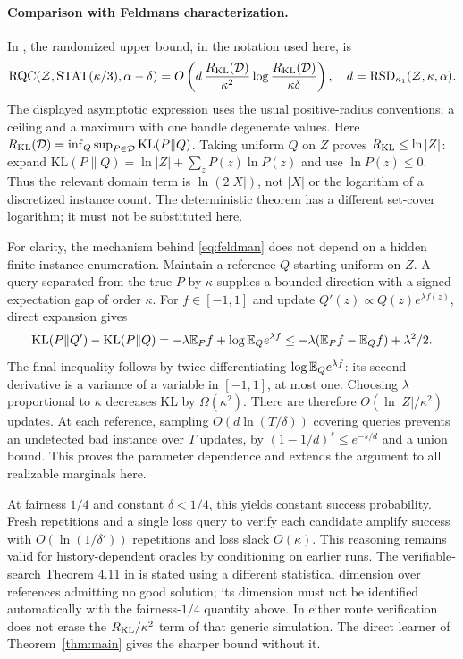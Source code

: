 \paragraph{Comparison with Feldman\textquotesingle s characterization.}
In \citet[Theorem 4.8]{Feldman17}, the randomized upper bound, in the notation used here, is
\begin{equation}\label{eq:feldman}
 \operatorname{RQC}(\mathcal Z,\operatorname{STAT}(\kappa/3),\alpha-\delta)
 =O\left(d\,\frac{R_{\rm KL}(\mathcal D)}{\kappa^2}
       \log\frac{R_{\rm KL}(\mathcal D)}{\kappa\delta}\right),
 \quad d=\operatorname{RSD}_{\kappa_1}(\mathcal Z,\kappa,\alpha).
\end{equation}
The displayed asymptotic expression uses the usual positive-radius conventions; a ceiling and a maximum with one handle degenerate values. Here $R_{\rm KL}(\mathcal D)=\inf_Q\sup_{P\in\mathcal D}\mathrm{KL}(P\|Q)$. Taking uniform $Q$ on $Z$ proves $R_{\rm KL}\le\ln|Z|$: expand $\mathrm{KL}(P\|Q)=\ln|Z|+\sum_zP(z)\ln P(z)$ and use $\ln P(z)\le0$. Thus the relevant domain term is $\ln(2|X|)$, not $|X|$ or the logarithm of a discretized instance count. The deterministic theorem has a different set-cover logarithm; it must not be substituted here.

For clarity, the mechanism behind \eqref{eq:feldman} does not depend on a hidden finite-instance enumeration. Maintain a reference $Q$ starting uniform on $Z$. A query separated from the true $P$ by $\kappa$ supplies a bounded direction with a signed expectation gap of order $\kappa$. For $f\in[-1,1]$ and update $Q'(z)\propto Q(z)e^{\lambda f(z)}$, direct expansion gives
\[
 \mathrm{KL}(P\|Q')-\mathrm{KL}(P\|Q)
 =-\lambda\mathbb E_Pf+\log\mathbb E_Qe^{\lambda f}
 \le-\lambda(\mathbb E_Pf-\mathbb E_Qf)+\lambda^2/2.
\]
The final inequality follows by twice differentiating $\log\mathbb E_Qe^{\lambda f}$: its second derivative is a variance of a variable in $[-1,1]$, at most one. Choosing $\lambda$ proportional to $\kappa$ decreases KL by $\Omega(\kappa^2)$. There are therefore $O(\ln|Z|/\kappa^2)$ updates. At each reference, sampling $O(d\ln(T/\delta))$ covering queries prevents an undetected bad instance over $T$ updates, by $(1-1/d)^s\le e^{-s/d}$ and a union bound. This proves the parameter dependence and extends the argument to all realizable marginals here.

At fairness $1/4$ and constant $\delta<1/4$, this yields constant success probability. Fresh repetitions and a single loss query to verify each candidate amplify success with $O(\ln(1/\delta'))$ repetitions and loss slack $O(\kappa)$. This reasoning remains valid for history-dependent oracles by conditioning on earlier runs. The verifiable-search Theorem 4.11 in \citet{Feldman17} is stated using a different statistical dimension over references admitting no good solution; its dimension must not be identified automatically with the fairness-$1/4$ quantity above. In either route verification does not erase the $R_{\rm KL}/\kappa^2$ term of that generic simulation. The direct learner of Theorem~\ref{thm:main} gives the sharper bound without it.
